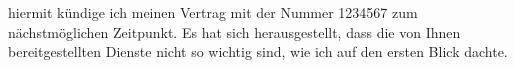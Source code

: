 \documentclass[
	a4paper,
	oneside,
	12pt
]{g-brief}
\begin{document}
\begin{g-brief}
hiermit kündige ich meinen Vertrag mit der Nummer 1234567 zum nächstmöglichen Zeitpunkt.
Es hat sich herausgestellt, dass die von Ihnen bereitgestellten Dienste nicht so wichtig sind,
wie ich auf den ersten Blick dachte.
\end{g-brief}
\end{document}
